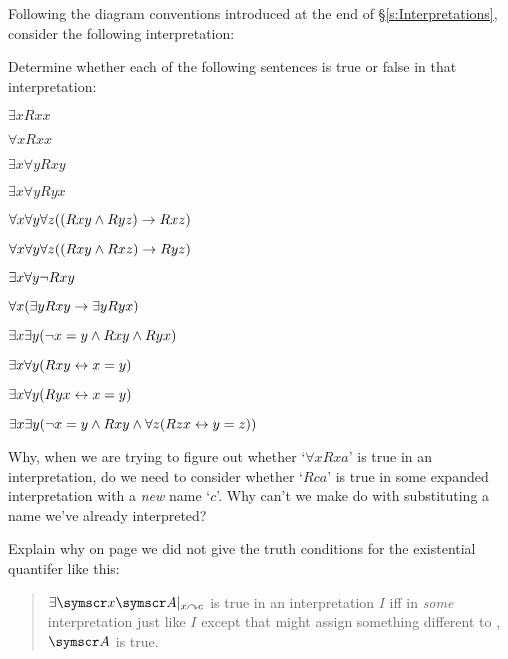\problempart
Following the diagram conventions introduced at the end of §\ref{s:Interpretations}, consider the following interpretation:	
\begin{center}
\end{center}
Determine whether each of the following sentences is true or false in that interpretation:
\begin{earg}
\item $\exists x Rxx$
\item $\forall x Rxx$
\item $\exists x \forall y Rxy$
\item $\exists x \forall y Ryx$
\item $\forall x \forall y \forall z ((Rxy \wedge Ryz) \rightarrow Rxz)$
\item $\forall x \forall y \forall z ((Rxy \wedge Rxz) \rightarrow Ryz)$
\item $\exists x \forall y \neg Rxy$
\item $\forall x(\exists y Rxy \rightarrow \exists y Ryx)$
\item $\exists x \exists y (\neg x = y \wedge Rxy \wedge Ryx)$
\item $\exists x \forall y(Rxy \leftrightarrow x = y)$
\item $\exists x \forall y(Ryx \leftrightarrow x = y)$
\item $\exists x \exists y(\neg x = y \wedge Rxy \wedge \forall z(Rzx \leftrightarrow y = z))$
\end{earg}

\problempart
Why, when we are trying to figure out whether `$\forall x Rxa$' is true in an interpretation, do we need to consider whether `$Rca$' is true in some expanded interpretation with a \emph{new} name `$c$'. Why can't we make do with substituting a name we've already interpreted?

\problempart
Explain why on page \pageref{quant.tcs.precise} we did not give the truth conditions for the existential quantifer like this: \begin{quote}
	$\exists\meta{x}\meta{A}\subs{x}{c}$ is true in an interpretation $I$ iff in \emph{some} interpretation just like $I$ except that might assign something different to , $\meta{A}$ is true.
\end{quote}






